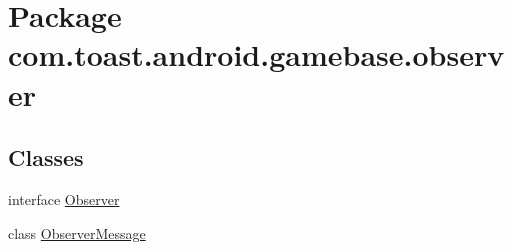 \hypertarget{namespacecom_1_1toast_1_1android_1_1gamebase_1_1observer}{}\section{Package com.\+toast.\+android.\+gamebase.\+observer}
\label{namespacecom_1_1toast_1_1android_1_1gamebase_1_1observer}
\subsection*{Classes}
\begin{DoxyCompactItemize}
\item 
interface \hyperlink{interfacecom_1_1toast_1_1android_1_1gamebase_1_1observer_1_1_observer}{Observer}
\item 
class \hyperlink{classcom_1_1toast_1_1android_1_1gamebase_1_1observer_1_1_observer_message}{Observer\+Message}
\end{DoxyCompactItemize}
